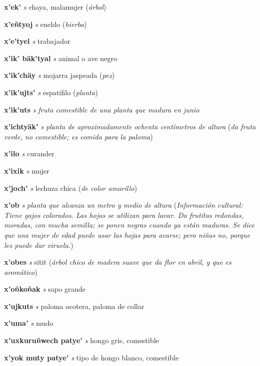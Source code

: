 \documentclass[10pt]{scrbook}
\newcommand{\entry}[1]{\textbf{#1}}
\newcommand{\nontranslationdef}[1]{\textit{#1}}
\newcommand{\partofspeech}[1]{\textit{#1}}
\newcommand{\spanishtranslation}[1]{#1}
\newcommand{\clarification}[1]{(\textit{#1})}
\newcommand{\culturalinformation}[1]{(\textit{#1})}
\begin{document}
\begin{multicols}{2}
\entry{x'ek'}
\partofspeech{s}
\spanishtranslation{chaya, malamujer}
\clarification{árbol}

\entry{x'eñtyoj}
\partofspeech{s}
\spanishtranslation{eneldo}
\clarification{hierba}

\entry{x'e'tyel}
\partofspeech{s}
\spanishtranslation{trabajador}

\entry{x'ik' bäk'tyal}
\partofspeech{s}
\spanishtranslation{animal o ave negro}

\entry{x'ik'chäy}
\partofspeech{s}
\spanishtranslation{mojarra jaspeada}
\clarification{pez}

\entry{x'ik'ujts'}
\partofspeech{s}
\spanishtranslation{espatifilo}
\clarification{planta}

\entry{x'ik'uts}
\partofspeech{s}
\nontranslationdef{fruta comestible de una planta que madura en junio}

\entry{x'ichtyäk'}
\partofspeech{s}
\nontranslationdef{planta de aproximadamente ochenta centímetros de altura}
\clarification{da fruta verde, no comestible; es comida para la paloma}

\entry{x'ilo}
\partofspeech{s}
\spanishtranslation{curander}

\entry{x'ixik}
\partofspeech{s}
\spanishtranslation{mujer}

\entry{x'joch'}
\partofspeech{s}
\spanishtranslation{lechuza chica}
\clarification{de color amarillo}

\entry{x'ob}
\partofspeech{s}
\nontranslationdef{planta que alcanza un metro y medio de altura}
\culturalinformation{Información cultural: Tiene gajos colorados. Las hojas se utilizan para lavar. Da frutitas redondas, moradas, con mucha semilla; se ponen negras cuando ya están maduras. Se dice que una mujer de edad puede usar las hojas para avarse; pero niñas no, porque les puede dar viruela.}

\entry{x'obes}
\partofspeech{s}
\spanishtranslation{sitit}
\clarification{árbol chico de madera suave que da flor en abril, y que es aromático}

\entry{x'oñkoñak}
\partofspeech{s}
\spanishtranslation{sapo grande}

\entry{x'ujkuts}
\partofspeech{s}
\spanishtranslation{paloma ocotera, paloma de collar}

\entry{x'uma'}
\partofspeech{s}
\spanishtranslation{mudo}

\entry{x'uxkuruñwech patye'}
\partofspeech{s}
\spanishtranslation{hongo gris, comestible}

\entry{x'yok muty patye'}
\partofspeech{s}
\spanishtranslation{tipo de hongo blanco, comestible}


\end{multicols}
\end{document}
